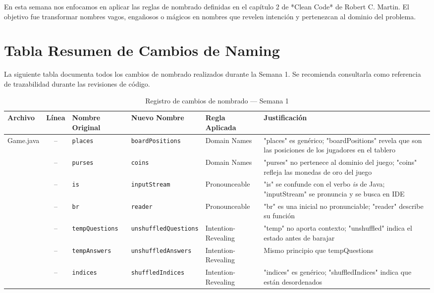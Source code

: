 En esta semana nos enfocamos en aplicar las reglas de nombrado definidas en el capítulo 2 de *Clean Code* de Robert C. Martin. El objetivo fue transformar nombres vagos, engañosos o mágicos en nombres que revelen intención y pertenezcan al dominio del problema.

\section{Tabla Resumen de Cambios de Naming}

La siguiente tabla documenta todos los cambios de nombrado realizados durante la Semana 1. Se recomienda consultarla como referencia de trazabilidad durante las revisiones de código.

\begin{table}[h]
\small
\centering
\caption{Registro de cambios de nombrado — Semana 1}
\label{tab:semana1-cambios}
\begin{tabular}{|p{2.5cm}|c|p{2.8cm}|p{3cm}|p{2.5cm}|p{4cm}|}
\hline
\textbf{Archivo} & \textbf{Línea} & \textbf{Nombre Original} & \textbf{Nuevo Nombre} & \textbf{Regla Aplicada} & \textbf{Justificación} \\
\hline
\multirow{4}{*}{Game.java}
  & -- & \texttt{places} & \texttt{boardPositions} & Domain Names & "places" es genérico; "boardPositions" revela que son las posiciones de los jugadores en el tablero \\ \cline{2-6}
  & -- & \texttt{purses} & \texttt{coins} & Domain Names & "purses" no pertenece al dominio del juego; "coins" refleja las monedas de oro del juego \\ \cline{2-6}
  & -- & \texttt{is} & \texttt{inputStream} & Pronounceable & "is" se confunde con el verbo \textit{is} de Java; "inputStream" se pronuncia y se busca en IDE \\ \cline{2-6}
  & -- & \texttt{br} & \texttt{reader} & Pronounceable & "br" es una inicial no pronunciable; "reader" describe su función \\ \cline{2-6}
  & -- & \texttt{tempQuestions} & \texttt{unshuffledQuestions} & Intention-Revealing & "temp" no aporta contexto; "unshuffled" indica el estado antes de barajar \\ \cline{2-6}
  & -- & \texttt{tempAnswers} & \texttt{unshuffledAnswers} & Intention-Revealing & Mismo principio que tempQuestions \\ \cline{2-6}
  & -- & \texttt{indices} & \texttt{shuffledIndices} & Intention-Revealing & "indices" es genérico; "shuffledIndices" indica que están desordenados \\ \cline{2-6}

\end{tabular}
\end{table}

